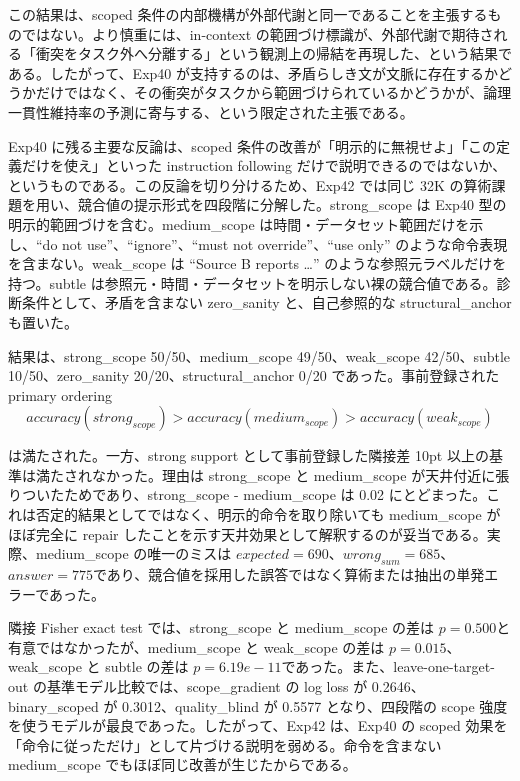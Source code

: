 \documentclass[12pt,a4paper]{article}
\begin{document}
この結果は、scoped 条件の内部機構が外部代謝と同一であることを主張するものではない。より慎重には、in-context の範囲づけ標識が、外部代謝で期待される「衝突をタスク外へ分離する」という観測上の帰結を再現した、という結果である。したがって、Exp40 が支持するのは、矛盾らしき文が文脈に存在するかどうかだけではなく、その衝突がタスクから範囲づけられているかどうかが、論理一貫性維持率の予測に寄与する、という限定された主張である。

Exp40 に残る主要な反論は、scoped 条件の改善が「明示的に無視せよ」「この定義だけを使え」といった instruction following だけで説明できるのではないか、というものである。この反論を切り分けるため、Exp42 では同じ 32K の算術課題を用い、競合値の提示形式を四段階に分解した。strong\_scope は Exp40 型の明示的範囲づけを含む。medium\_scope は時間・データセット範囲だけを示し、``do not use''、``ignore''、``must not override''、``use only'' のような命令表現を含まない。weak\_scope は ``Source B reports \ldots{}'' のような参照元ラベルだけを持つ。subtle は参照元・時間・データセットを明示しない裸の競合値である。診断条件として、矛盾を含まない zero\_sanity と、自己参照的な structural\_anchor も置いた。

結果は、strong\_scope 50/50、medium\_scope 49/50、weak\_scope 42/50、subtle 10/50、zero\_sanity 20/20、structural\_anchor 0/20 であった。事前登録された primary ordering \[
accuracy(strong_{scope}) > accuracy(medium_{scope}) > accuracy(weak_{scope})
\]

は満たされた。一方、strong support として事前登録した隣接差 10pt 以上の基準は満たされなかった。理由は strong\_scope と medium\_scope が天井付近に張りついたためであり、strong\_scope - medium\_scope は 0.02 にとどまった。これは否定的結果としてではなく、明示的命令を取り除いても medium\_scope がほぼ完全に repair したことを示す天井効果として解釈するのが妥当である。実際、medium\_scope の唯一のミスは \(expected=690\)、\(wrong_{sum}=685\)、\(answer=775\)であり、競合値を採用した誤答ではなく算術または抽出の単発エラーであった。

隣接 Fisher exact test では、strong\_scope と medium\_scope の差は \(p = 0.500\)と有意ではなかったが、medium\_scope と weak\_scope の差は \(p = 0.015\)、weak\_scope と subtle の差は \(p = 6.19e-11\)であった。また、leave-one-target-out の基準モデル比較では、scope\_gradient の log loss が 0.2646、binary\_scoped が 0.3012、quality\_blind が 0.5577 となり、四段階の scope 強度を使うモデルが最良であった。したがって、Exp42 は、Exp40 の scoped 効果を「命令に従っただけ」として片づける説明を弱める。命令を含まない medium\_scope でもほぼ同じ改善が生じたからである。
\end{document}
